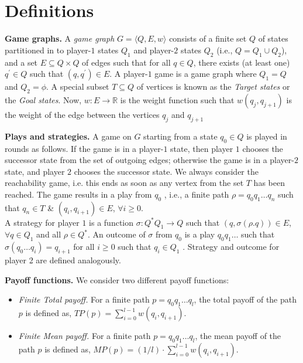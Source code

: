 \section{Definitions}

\textbf{Game graphs.}  A \textit{game graph} $G= \langle Q,E,w \rangle$ consists of a finite set $Q$ of states partitioned in to player-$1$ states $Q_1$ and player-$2$ states $Q_2$ (i.e., $Q = Q_1 \cup Q_2$), and a set $E \subseteq Q \times Q$ of edges such that for all $q \in Q$, there exists (at least one) $q^{\prime} \in Q$ such that $(q, q^{\prime}) \in E$. A player-$1$ game is a game graph where $Q_1 = Q$ and $Q_2 = \phi$. A special subset $T \subseteq Q$ of vertices is known as the \textit{Target states} or the \textit{Goal states}. Now, $w : E \rightarrow \mathbb{R}$ is the weight function such that $w(q_j,q_{j+1})$ is the weight of the edge between the vertices $q_j$ and $q_{j+1}$ \\
\vskip 0.6cm


\textbf{Plays and strategies.} A game on $G$ starting from a state $q_0 \in Q$ is played in rounds as follows. If the game is in a player-$1$ state, then player $1$ chooses the successor state from the set of outgoing edges; otherwise the game is in a player-$2$ state, and player $2$ chooses the successor state. We always consider the reachability game, i.e. this ends as soon as any vertex from the set $T$ has been reached. The game results in a play from $q_0$ , i.e., a finite path $\rho = q_0 q_1 \ldots q_n$ such that $q_n \in T$ \& $(q_i , q_{i+1}) \in E$, $\forall i \geq 0$. \\
A strategy for player $1$ is a function $\sigma : Q^{*} Q_1 \rightarrow Q$ such that $(q, \sigma(\rho . q)) \in E$,
$\forall q \in Q_1$ and all $\rho \in Q^{*}$. An outcome of $\sigma$ from $q_0$ is a play $q_0 q_1 \ldots$ such that $\sigma(q_0 \ldots q_i) = q_ {i+1}$ for all $i \geq 0$ such that $q_i \in Q_1$ . Strategy and outcome for player 2 are defined analogously.\\
\vskip 0.6cm 


\textbf{Payoff functions.} We consider two different payoff functions:
\begin{itemize}
	\item \textit{Finite Total payoff.} For a finite path $p=q_0 q_1 \ldots q_l$, the total payoff of the path $p$ is defined as, $TP(p)= \sum_{i=0}^{l-1} w(q_i,q_{i+1})$.

	\item \textit{Finite Mean payoff.} For a finite path $p=q_0 q_1 \ldots q_l$, the mean payoff of the path $p$ is defined as, $MP(p)= (1/l) \cdot \sum_{i=0}^{l-1} w(q_i,q_{i+1})$.
\end{itemize}
\vskip 0.6cm


